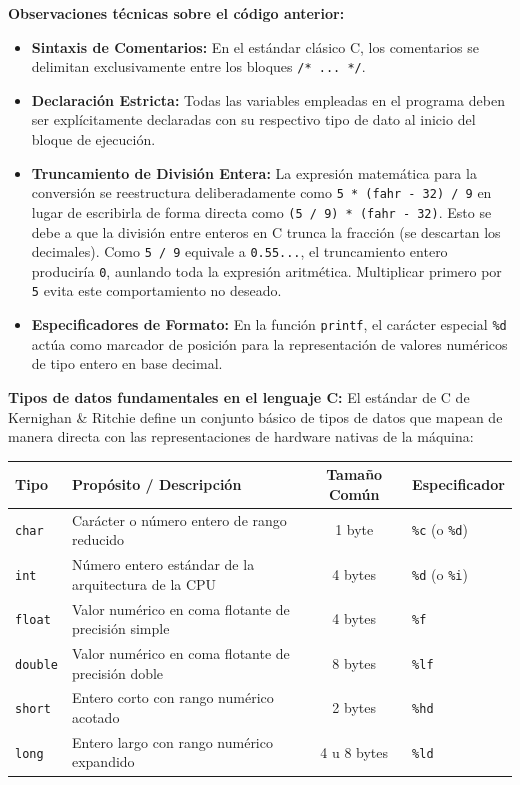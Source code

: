 \documentclass[11pt, a4paper]{article}
\begin{document}
\noindent\textbf{Observaciones técnicas sobre el código anterior:}
\begin{itemize}
  \item \textbf{Sintaxis de Comentarios:} En el estándar clásico C, los comentarios se delimitan exclusivamente entre los bloques \texttt{/* ... */}.
  \item \textbf{Declaración Estricta:} Todas las variables empleadas en el programa deben ser explícitamente declaradas con su respectivo tipo de dato al inicio del bloque de ejecución.
  \item \textbf{Truncamiento de División Entera:} La expresión matemática para la conversión se reestructura deliberadamente como \texttt{5 * (fahr - 32) / 9} en lugar de escribirla de forma directa como \texttt{(5 / 9) * (fahr - 32)}. Esto se debe a que la división entre enteros en C trunca la fracción (se descartan los decimales). Como \texttt{5 / 9} equivale a \texttt{0.55...}, el truncamiento entero produciría \texttt{0}, aunlando toda la expresión aritmética. Multiplicar primero por \texttt{5} evita este comportamiento no deseado.
  \item \textbf{Especificadores de Formato:} En la función \texttt{printf}, el carácter especial \texttt{\%d} actúa como marcador de posición para la representación de valores numéricos de tipo entero en base decimal.
\end{itemize}

\noindent\textbf{Tipos de datos fundamentales en el lenguaje C:}
El estándar de C de Kernighan \& Ritchie define un conjunto básico de tipos de datos que mapean de manera directa con las representaciones de hardware nativas de la máquina:

\begin{center}
\small
\begin{tabular}{llcl}
\toprule
\textbf{Tipo} & \textbf{Propósito / Descripción} & \textbf{Tamaño Común} & \textbf{Especificador} \\
\midrule
\texttt{char} & Carácter o número entero de rango reducido & 1 byte & \texttt{\%c} (o \texttt{\%d}) \\
\texttt{int} & Número entero estándar de la arquitectura de la CPU & 4 bytes & \texttt{\%d} (o \texttt{\%i}) \\
\texttt{float} & Valor numérico en coma flotante de precisión simple & 4 bytes & \texttt{\%f} \\
\texttt{double} & Valor numérico en coma flotante de precisión doble & 8 bytes & \texttt{\%lf} \\
\texttt{short} & Entero corto con rango numérico acotado & 2 bytes & \texttt{\%hd} \\
\texttt{long} & Entero largo con rango numérico expandido & 4 u 8 bytes & \texttt{\%ld} \\
\bottomrule
\end{tabular}
\end{center}
\end{document}
